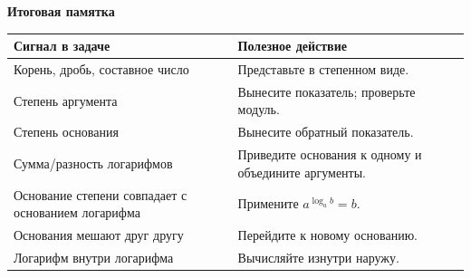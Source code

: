 \documentclass[a4paper,11pt]{article}
\begin{document}
\vspace{7mm}
{\color{darkaccent}\bfseries Итоговая памятка}\par
\smallskip
\begin{tabularx}{\linewidth}{@{}p{.39\linewidth}X@{}}
\toprule
Сигнал в задаче & Полезное действие\\
\midrule
Корень, дробь, составное число & Представьте в степенном виде.\\
Степень аргумента & Вынесите показатель; проверьте модуль.\\
Степень основания & Вынесите обратный показатель.\\
Сумма/разность логарифмов & Приведите основания к одному и объедините аргументы.\\
Основание степени совпадает с основанием логарифма & Примените \(a^{\log_a b}=b\).\\
Основания мешают друг другу & Перейдите к новому основанию.\\
Логарифм внутри логарифма & Вычисляйте изнутри наружу.\\
\bottomrule
\end{tabularx}
\end{document}

